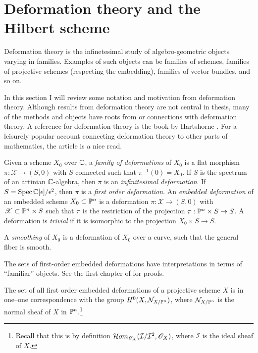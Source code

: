 

\section{Deformation theory and the Hilbert scheme}

Deformation theory is the infinetesimal study of algebro-geometric objects varying in families. Examples of such objects can be families of schemes, families of projective schemes (respecting the embedding), families of vector bundles, and so on.

In this section I will review some notation and motivation from deformation theory. Although results from deformation theory are not central in thesis, many of the methods and objects have roots from or connections with deformation theory. A reference for deformation theory is the book by Hartshorne \cite{hartshorne_deformations}. For a leisurely popular account connecting deformation theory to other parts of mathematics, the article \cite{mazur_deformations} is a nice read.

\begin{definition}
Given a scheme $X_0$ over $\C$, a \emph{family of deformations} of $X_0$ is a flat morphism $\pi:\mathscr X \to (S,0)$ with $S$ connected such that $\pi^{-1}(0)=X_0$. If $S$ is the spectrum of an artinian $\C$-algebra, then $\pi$ is an \emph{infinitesimal deformation}. If $S=\Spec \C[\epsilon]/\epsilon^2$, then  $\pi$ is a \emph{first order deformation}. An \emph{embedded deformation} of an embedded scheme $X_0 \subset \P^n$ is a deformation $\pi:\mathscr X \to (S,0)$ with $\mathscr X \subset \P^n \times S$ such that $\pi$ is the restriction of the projection $\pi:\P^n \times S \to S$. A deformation is \emph{trivial} if it is isomorphic to the projection $X_0 \times S \to S$.  

A \emph{smoothing} of $X_0$ is a deformation of $X_0$ over a curve, such that the general fiber is smooth.
\end{definition}

The sets of first-order embedded deformations have interpretations in terms of ``familiar'' objects. See the first chapter of \cite{hartshorne_deformations} for proofs.

\begin{proposition}
The set of all first order embedded deformations of a projective scheme $X$ is in one--one correspondence with the group $H^0(X,\mathcal N_{X/\P^n})$, where $\mathcal N_{X/\P^n}$ is the normal sheaf of $X$ in $\P^n$.\footnote{Recall that this is by definition $\mathcal Hom_{\OO_X}(\mathcal I/\mathcal I^2, \OO_X)$, where $\mathcal I$ is the ideal sheaf of $X$.}
\end{proposition}

